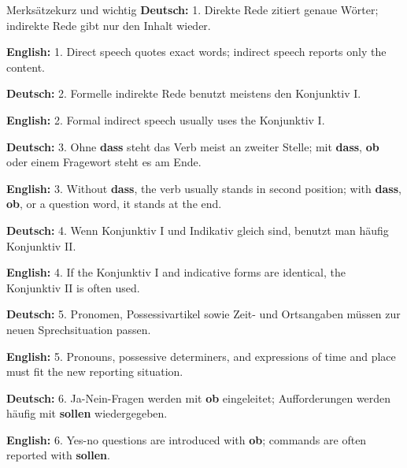 \documentclass[a4paper,11pt]{article}
\newcommand{\GermanText}[1]{\textbf{Deutsch: }#1\par}
\newcommand{\EnglishText}[1]{{\small\color{SoftGray}\textbf{English: }#1\par}}
\begin{document}
        \begin{grammarentry}{Merksätze}{kurz und wichtig}
            \GermanText{1. Direkte Rede zitiert genaue Wörter; indirekte Rede gibt nur den Inhalt wieder.}
            \EnglishText{1. Direct speech quotes exact words; indirect speech reports only the content.}

            \GermanText{2. Formelle indirekte Rede benutzt meistens den Konjunktiv I.}
            \EnglishText{2. Formal indirect speech usually uses the Konjunktiv I.}

            \GermanText{3. Ohne \textbf{dass} steht das Verb meist an zweiter Stelle; mit \textbf{dass}, \textbf{ob} oder einem Fragewort steht es am Ende.}
            \EnglishText{3. Without \textbf{dass}, the verb usually stands in second position; with \textbf{dass}, \textbf{ob}, or a question word, it stands at the end.}

            \GermanText{4. Wenn Konjunktiv I und Indikativ gleich sind, benutzt man häufig Konjunktiv II.}
            \EnglishText{4. If the Konjunktiv I and indicative forms are identical, the Konjunktiv II is often used.}

            \GermanText{5. Pronomen, Possessivartikel sowie Zeit- und Ortsangaben müssen zur neuen Sprechsituation passen.}
            \EnglishText{5. Pronouns, possessive determiners, and expressions of time and place must fit the new reporting situation.}

            \GermanText{6. Ja-Nein-Fragen werden mit \textbf{ob} eingeleitet; Aufforderungen werden häufig mit \textbf{sollen} wiedergegeben.}
            \EnglishText{6. Yes-no questions are introduced with \textbf{ob}; commands are often reported with \textbf{sollen}.}
        \end{grammarentry}
\end{document}

